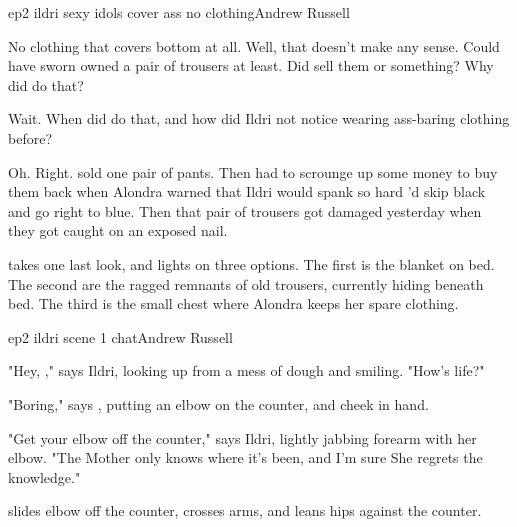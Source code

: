 \documentclass{book}
\begin{document}
\begin{childnode}{ep2 ildri sexy idols cover ass no clothing}{Andrew Russell}

    No clothing that covers \hisher{} bottom at all. Well, that doesn't make any sense. Could have sworn \heshe{} owned a pair of trousers at least. Did \heshe{} sell them or something? Why did 
    \heshe{} do that?

    Wait. When did \heshe{} do that, and how did Ildri not notice \himher{} wearing ass-baring clothing before?

    Oh. Right. \HeShe{} sold one pair of pants. Then \heshe{} had to scrounge up some money to buy them back when Alondra warned \himher{} that Ildri would spank \himher{} so hard \heshe{}'d skip
    black and go right to blue. Then that pair of trousers got damaged yesterday when they got caught on an exposed nail. 

    \names{} takes one last look, and lights on three options. The first is the blanket on \hisher{} bed. The second are the ragged remnants of \names{} old trousers, currently hiding beneath
    \hisher{} bed. The third is the small chest where Alondra keeps her spare clothing.




\end{childnode}

\begin{childnode}{ep2 ildri scene 1 chat}{Andrew Russell} 

    "Hey, \name{}," says Ildri, looking up from a mess of dough and smiling. "How's life?"

    "Boring," says \name{}, putting an elbow on the counter, and \hisher{} cheek in \hisher{} hand.

    "Get your elbow off the counter," says Ildri, lightly jabbing \names{} forearm with her elbow. "The Mother only knows where it's been, and I'm sure She regrets the knowledge."

    \name{} slides \hisher{} elbow off the counter, crosses \hisher{} arms, and leans \hisher{} hips against the counter. 



\end{childnode}
\end{document}
